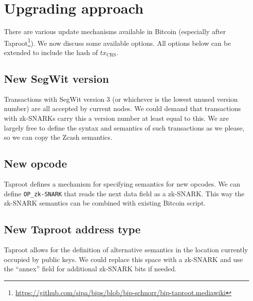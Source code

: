 \section{Upgrading approach}
  There are various update mechanisms available in Bitcoin (especially after
  Taproot\footnote{\url{https://github.com/sipa/bips/blob/bip-schnorr/bip-taproot.mediawiki}}).
  We now discuss some available options. All options below can be extended to
  include the hash of $\mathit{tx}_{\mathrm{CRS}}$.
  \subsection{New SegWit version}
    Transactions with SegWit version 3 (or whichever is the lowest unused
    version number) are all accepted by current nodes. We could demand that
    transactions with zk-SNARKs carry this a version number at least equal to this.
    We are largely free to define the syntax and semantics of such transactions
    as we please, so we can copy the Zcash semantics.
  \subsection{New opcode}
    Taproot defines a mechanism for specifying semantics for new opcodes. We can
    define \texttt{OP\_zk-SNARK} that reads the next data field as a zk-SNARK. This
    way the zk-SNARK semantics can be combined with existing Bitcoin script.
  \subsection{New Taproot address type}
    Taproot allows for the definition of alternative semantics in the location
    currently occupied by public keys. We could replace this space with a zk-SNARK
    and use the ``annex'' field for additional zk-SNARK bits if needed.
